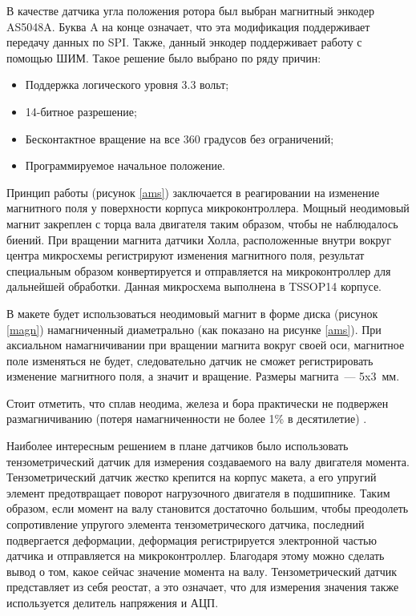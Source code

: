 В качестве датчика угла положения ротора был выбран магнитный энкодер AS5048A. Буква A на
конце означает, что эта модификация поддерживает передачу данных по SPI. Также, данный
энкодер поддерживает работу с помощью ШИМ. Такое решение было выбрано по ряду причин:
\begin{itemize}
  \item Поддержка логического уровня 3.3 вольт;
  \item 14-битное разрешение;
  \item Бесконтактное вращение на все 360 градусов без ограничений;
  \item Программируемое начальное положение.
\end{itemize}
Принцип работы (рисунок \ref{ams}) заключается в реагировании на изменение магнитного поля у поверхности 
корпуса микроконтроллера. Мощный неодимовый магнит закреплен с торца вала двигателя
таким образом, чтобы не наблюдалось биений. При вращении магнита датчики Холла, 
расположенные внутри вокруг центра микросхемы регистрируют изменения магнитного поля,
результат специальным образом конвертируется и отправляется на микроконтроллер для
дальнейшей обработки. Данная микросхема выполнена в TSSOP14 корпусе. 


В макете будет использоваться неодимовый магнит в форме диска (рисунок \ref{magn}) намагниченный диаметрально
(как показано на рисунке \ref{ams}). При аксиальном намагничивании при вращении магнита вокруг своей оси,
магнитное поле изменяться не будет, следовательно датчик не сможет регистрировать изменение
магнитного поля, а значит и вращение. Размеры магнита~— 5x3~мм.


Стоит отметить, 
что сплав неодима, железа и бора практически не подвержен размагничиванию 
(потеря намагниченности не более 1\% в десятилетие) \cite{Магстанд}. 

Наиболее интересным решением в плане датчиков было использовать тензометрический датчик
для измерения создаваемого на валу двигателя момента. Тензометрический датчик жестко крепится
на корпус макета, а его упругий элемент предотвращает поворот нагрузочного двигателя в подшипнике.
Таким образом, если момент на валу становится достаточно большим, чтобы преодолеть сопротивление
упругого элемента тензометрического датчика, последний подвергается деформации, деформация 
регистрируется
электронной частью датчика и отправляется на микроконтроллер. Благодаря этому можно сделать вывод
о том, какое сейчас значение момента на валу. Тензометрический датчик представляет из себя
реостат, а это означает, что для измерения значения также используется делитель напряжения и АЦП.

